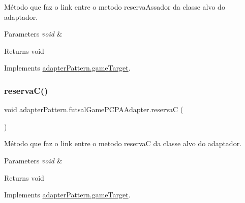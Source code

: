 Método que faz o link entre o metodo reserva\+Assador da classe alvo do adaptador. 


\begin{DoxyParams}{Parameters}
{\em void} & \\
\hline
\end{DoxyParams}
\begin{DoxyReturn}{Returns}
void 
\end{DoxyReturn}


Implements \mbox{\hyperlink{interfaceadapter_pattern_1_1game_target_a67348260f14d11e317195e2d66dbff18}{adapter\+Pattern.\+game\+Target}}.

\mbox{\label{classadapter_pattern_1_1futsal_game_p_c_p_a_adapter_ac19d4edc47f38991cd9a07682f4efc45}} 
\subsubsection{\texorpdfstring{reservaC()}{reservaC()}}
{\footnotesize\ttfamily void adapter\+Pattern.\+futsal\+Game\+P\+C\+P\+A\+Adapter.\+reservaC (\begin{DoxyParamCaption}{ }\end{DoxyParamCaption})}



Método que faz o link entre o metodo reservaC da classe alvo do adaptador. 


\begin{DoxyParams}{Parameters}
{\em void} & \\
\hline
\end{DoxyParams}
\begin{DoxyReturn}{Returns}
void 
\end{DoxyReturn}


Implements \mbox{\hyperlink{interfaceadapter_pattern_1_1game_target_ae8c1c944929700a3e120e641118c9188}{adapter\+Pattern.\+game\+Target}}.

\mbox{\label{classadapter_pattern_1_1futsal_game_p_c_p_a_adapter_a28c5a42f15d0172202096458d4889b11}} 

